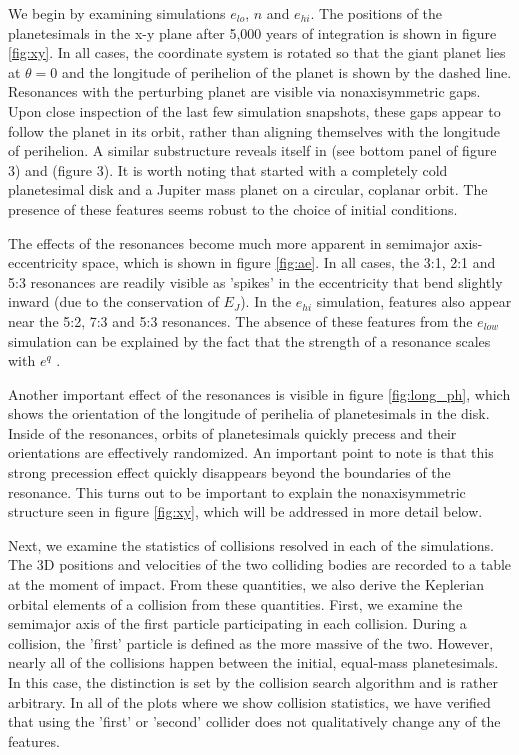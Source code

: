 \documentclass[onecolumn]{aastex63}
\begin{document}
We begin by examining simulations $e_{lo}$, $n$ and $e_{hi}$. The positions of the planetesimals in the x-y plane after 5,000 years of integration is shown in figure \ref{fig:xy}. In all cases, the coordinate system is rotated so that the giant planet lies at $\theta = 0$ and the longitude of perihelion of the planet is shown by the dashed line. Resonances with the perturbing planet are visible via nonaxisymmetric gaps. Upon close inspection of the last few simulation snapshots, these gaps appear to follow the planet in its orbit, rather than aligning themselves with the longitude of perihelion. A similar substructure reveals itself in \citet{2000Icar..143...45R} (see bottom panel of figure 3) and \citet{2016ApJ...818..159T} (figure 3). It is worth noting that \citet{2000Icar..143...45R} started with a completely cold planetesimal disk and a Jupiter mass planet on a circular, coplanar orbit. The presence of these features seems robust to the choice of initial conditions.

The effects of the resonances become much more apparent in semimajor axis-eccentricity space, which is shown in figure \ref{fig:ae}. In all cases, the 3:1, 2:1 and 5:3 resonances are readily visible as 'spikes' in the eccentricity that bend slightly inward (due to the conservation of $E_{J}$). In the $e_{hi}$ simulation, features also appear near the 5:2, 7:3 and 5:3 resonances. The absence of these features from the $e_{low}$ simulation can be explained by the fact that the strength of a resonance scales with $e^{q}$ \citep{1994PhyD...77..289M}.

Another important effect of the resonances is visible in figure \ref{fig:long_ph}, which shows the orientation of the longitude of perihelia of planetesimals in the disk. Inside of the resonances, orbits of planetesimals quickly precess and their orientations are effectively randomized. An important point to note is that this strong precession effect quickly disappears beyond the boundaries of the resonance. This turns out to be important to explain the nonaxisymmetric structure seen in figure \ref{fig:xy}, which will be addressed in more detail below.

Next, we examine the statistics of collisions resolved in each of the simulations. The 3D positions and velocities of the two colliding bodies are recorded to a table at the moment of impact. From these quantities, we also derive the Keplerian orbital elements of a collision from these quantities. First, we examine the semimajor axis of the first particle participating in each collision. During a collision, the 'first' particle is defined as the more massive of the two. However, nearly all of the collisions happen between the initial, equal-mass planetesimals. In this case, the distinction is set by the collision search algorithm and is rather arbitrary. In all of the plots where we show collision statistics, we have verified that using the 'first' or 'second' collider does not qualitatively change any of the features.
\end{document}
